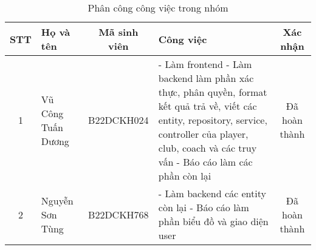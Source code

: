 \documentclass[../BTL.tex]{subfiles}
\begin{document}
\begin{table}[htbp]
	\centering
	\caption{Phân công công việc trong nhóm}
	\label{tab:phan-cong-cong-viec}
	\begin{tabularx}{\textwidth}{|c|l|c|X|c|}
		\hline
		\textbf{STT} & \textbf{Họ và tên} & \textbf{Mã sinh viên} & \textbf{Công việc} & \textbf{Xác nhận} \\
		\hline
		1 & Vũ Công Tuấn Dương & B22DCKH024 & 
		- Làm frontend\newline
		- Làm backend làm phần xác thực, phân quyền, format kết quả trả về, viết các entity, repository, service, controller của player, club, coach và các truy vấn\newline
		- Báo cáo làm các phần còn lại & Đã hoàn thành \\
		\hline
		2 & Nguyễn Sơn Tùng & B22DCKH768 & 
		- Làm backend các entity còn lại\newline
		- Báo cáo làm phần biểu đồ và giao diện user & Đã hoàn thành \\
		\hline
	\end{tabularx}
\end{table}
\end{document}
